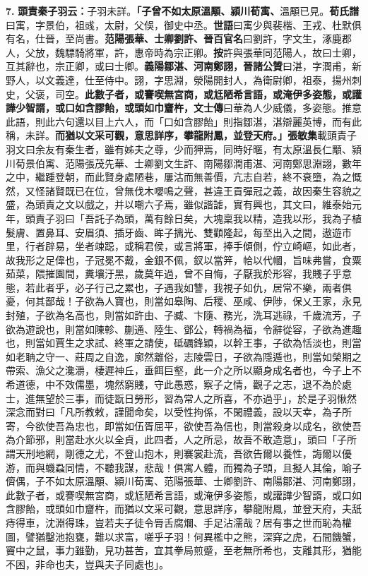\textbf{7.} \textbf{頭責秦子羽云：}{\footnotesize 子羽未詳。}\textbf{「子曾不如太原溫顒、潁川荀㝢、}{\footnotesize 溫顒已見。\textbf{荀氏譜}曰㝢，字景伯，祖彧，太尉，父俁，御史中丞。\textbf{世語}曰㝢少與裴楷、王戎、杜默俱有名，仕晉，至尚書。}\textbf{范陽張華、士卿劉許、}{\footnotesize \textbf{晉百官名}曰劉許，字文生，涿鹿郡人，父放，魏驃騎將軍，許，惠帝時為宗正卿。\textbf{按}許與張華同范陽人，故曰士卿，互其辭也，宗正卿，或曰士卿。}\textbf{義陽鄒湛、河南鄭詡，}{\footnotesize \textbf{晉諸公贊}曰湛，字潤甫，新野人，以文義達，仕至侍中。詡，字思淵，滎陽開封人，為衛尉卿，祖泰，揚州刺史，父褒，司空。}\textbf{此數子者，或謇喫無宮商，或尪陋希言語，或淹伊多姿態，或讙譁少智諝，或口如含膠飴，或頭如巾齏杵，}{\footnotesize \textbf{文士傳}曰華為人少威儀，多姿態。推意此語，則此六句還以目上六人，而「口如含膠飴」則指鄒湛，湛辯麗英博，而有此稱，未詳。}\textbf{而猶以文采可觀，意思詳序，攀龍附鳳，並登天府。」}{\footnotesize \textbf{張敏集}載頭責子羽文曰余友有秦生者，雖有姊夫之尊，少而狎焉，同時好暱，有太原溫長仁顒、潁川荀景伯㝢、范陽張茂先華、士卿劉文生許、南陽鄒潤甫湛、河南鄭思淵詡，數年之中，繼踵登朝，而此賢身處陋巷，屢沽而無善價，亢志自若，終不衰墮，為之慨然，又怪諸賢既已在位，曾無伐木嚶鳴之聲，甚違王貢彈冠之義，故因秦生容貌之盛，為頭責之文以戲之，并以嘲六子焉，雖似諧謔，實有興也，其文曰，維泰始元年，頭責子羽曰「吾託子為頭，萬有餘日矣，大塊稟我以精，造我以形，我為子植髮膚、置鼻耳、安眉須、插牙齒、眸子摛光、雙顴隆起，每至出入之間，遨遊市里，行者辟易，坐者竦跽，或稱君侯，或言將軍，捧手傾側，佇立崎嶇，如此者，故我形之足偉也，子冠冕不戴，金銀不佩，釵以當笄，帢以代幗，旨味弗嘗，食粟茹菜，隈摧園間，糞壤汙黑，歲莫年過，曾不自悔，子厭我於形容，我賤子乎意態，若此者乎，必子行己之累也，子遇我如讐，我視子如仇，居常不樂，兩者俱憂，何其鄙哉！子欲為人寶也，則當如皋陶、后稷、巫咸、伊陟，保乂王家，永見封殖，子欲為名高也，則當如許由、子臧、卞隨、務光，洗耳逃祿，千歲流芳，子欲為遊說也，則當如陳軫、蒯通、陸生、鄧公，轉禍為福，令辭從容，子欲為進趣也，則當如賈生之求試、終軍之請使，砥礪鋒穎，以幹王事，子欲為恬淡也，則當如老聃之守一、莊周之自逸，廓然離俗，志陵雲日，子欲為隱遁也，則當如榮期之帶索、漁父之瀺灂，棲遲神丘，垂餌巨壑，此一介之所以顯身成名者也，今子上不希道德，中不效儒墨，塊然窮賤，守此愚惑，察子之情，觀子之志，退不為於處士，進無望於三事，而徒翫日勞形，習為常人之所喜，不亦過乎」，於是子羽愀然深念而對曰「凡所教敕，謹聞命矣，以受性拘係，不閑禮義，設以天幸，為子所寄，今欲使吾為忠也，即當如伍胥屈平，欲使吾為信也，則當殺身以成名，欲使吾為介節邪，則當赴水火以全貞，此四者，人之所忌，故吾不敢造意」，頭曰「子所謂天刑地網，剛德之尤，不登山抱木，則褰裳赴流，吾欲告爾以養性，誨爾以優游，而與蟣蝨同情，不聽我謀，悲哉！俱寓人體，而獨為子頭，且擬人其倫，喻子儕偶，子不如太原溫顒、潁川荀㝢、范陽張華、士卿劉許、南陽鄒湛、河南鄭詡，此數子者，或謇喫無宮商，或尪陋希言語，或淹伊多姿態，或讙譁少智諝，或口如含膠飴，或頭如巾齏杵，而猶以文采可觀，意思詳序，攀龍附鳳，並登天府，夫舐痔得車，沈淵得珠，豈若夫子徒令脣舌腐爛、手足沾濡哉？居有事之世而恥為權圖，譬猶鑿池抱甕，難以求富，嗟乎子羽！何異檻中之熊，深穽之虎，石間饑蟹，竇中之鼠，事力雖勤，見功甚苦，宜其拳局煎蹙，至老無所希也，支離其形，猶能不困，非命也夫，豈與夫子同處也」。}


